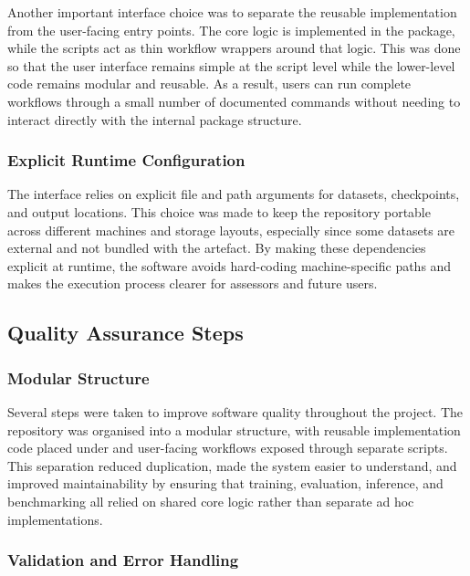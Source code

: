 ﻿\documentclass[11pt,a4paper]{article}
\begin{document}
Another important interface choice was to separate the reusable implementation
from the user-facing entry points. The core logic is implemented in the
 package, while the scripts act as thin workflow
wrappers around that logic.
This was done so that the user interface remains simple at the script level
while the lower-level code remains modular and reusable. As a result, users
can run complete workflows through a small number of documented commands
without needing to interact directly with the internal package structure.

\subsubsection*{Explicit Runtime Configuration}

The interface relies on explicit file and path arguments for datasets,
checkpoints, and output locations. This choice was made to keep the repository
portable across different machines and storage layouts, especially since some
datasets are external and not bundled with the artefact.
By making these dependencies explicit at runtime, the software avoids
hard-coding machine-specific paths and makes the execution process clearer for
assessors and future users.

\subsection{Quality Assurance Steps}

\subsubsection*{Modular Structure}

Several steps were taken to improve software quality throughout the project.
The repository was organised into a modular structure, with reusable
implementation code placed under  and user-facing
workflows exposed through separate scripts.
This separation reduced duplication, made the system easier to understand, and
improved maintainability by ensuring that training, evaluation, inference, and
benchmarking all relied on shared core logic rather than separate ad hoc
implementations.

\subsubsection*{Validation and Error Handling}
\end{document}
